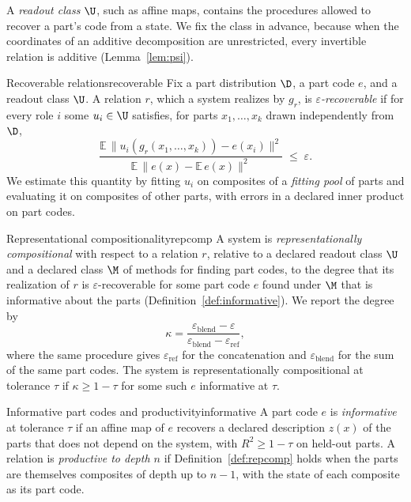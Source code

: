 A \emph{readout class} $\U$, such as affine maps, contains the procedures allowed to recover a part's code from a state. We fix the class in advance, because when the coordinates of an additive decomposition are unrestricted, every invertible relation is additive (Lemma~\ref{lem:psi}).

\begin{defbox}{Recoverable relations}{recoverable}
Fix a part distribution $\D$, a part code $e$, and a readout class $\U$. A relation $r$, which a system realizes by $g_r$, is \emph{$\varepsilon$-recoverable} if for every role $i$ some $u_i \in \U$ satisfies, for parts $x_1, \ldots, x_k$ drawn independently from $\D$,
\begin{equation}
  \frac{\mathbb{E}\,\lVert u_i(g_r(x_1,\ldots,x_k)) - e(x_i) \rVert^2}{\mathbb{E}\,\lVert e(x) - \mathbb{E}\,e(x) \rVert^2} \;\le\; \varepsilon .
  \label{eq:recover}
\end{equation}
We estimate this quantity by fitting $u_i$ on composites of a \emph{fitting pool} of parts and evaluating it on composites of other parts, with errors in a declared inner product on part codes.
\end{defbox}

\begin{defbox}{Representational compositionality}{repcomp}
A system is \emph{representationally compositional} with respect to a relation $r$, relative to a declared readout class $\U$ and a declared class $\M$ of methods for finding part codes, to the degree that its realization of $r$ is $\varepsilon$-recoverable for some part code $e$ found under $\M$ that is informative about the parts (Definition~\ref{def:informative}). We report the degree by
\begin{equation}
  \kappa = \frac{\varepsilon_{\mathrm{blend}} - \varepsilon}{\varepsilon_{\mathrm{blend}} - \varepsilon_{\mathrm{ref}}},
  \label{eq:kappa}
\end{equation}
where the same procedure gives $\varepsilon_{\mathrm{ref}}$ for the concatenation and $\varepsilon_{\mathrm{blend}}$ for the sum of the same part codes. The system is representationally compositional at tolerance $\tau$ if $\kappa \ge 1 - \tau$ for some such $e$ informative at $\tau$.
\end{defbox}

\begin{defbox}{Informative part codes and productivity}{informative}
A part code $e$ is \emph{informative} at tolerance $\tau$ if an affine map of $e$ recovers a declared description $z(x)$ of the parts that does not depend on the system, with $R^2 \ge 1 - \tau$ on held-out parts. A relation is \emph{productive to depth $n$} if Definition~\ref{def:repcomp} holds when the parts are themselves composites of depth up to $n - 1$, with the state of each composite as its part code.
\end{defbox}

